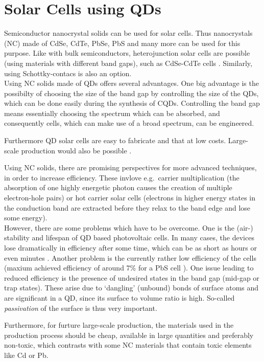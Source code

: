 \section{Solar Cells using QDs}

Semiconductor nanocrystal solids can be used for solar cells. Thus nanocrystals (NC) made of CdSe, CdTe, PbSe, PbS and many more can be used for this purpose. Like with bulk semiconductors, heterojunction solar cells are possible (using materials with different band gaps), such as CdSe-CdTe cells \cite[p.430]{ChemRev}. Similarly, using Schottky-contacs is also an option.\\

Using NC solids made of QDs offers several advantages. One big advantage is the possibilty of choosing the size of the band gap by controlling the size of the QDs, which can be done easily during the synthesis of CQDs. Controlling the band gap means essentially choosing the spectrum which can be absorbed, and consequently cells, which can make use of a broad spectrum, can be engineered.

Furthermore QD solar cells are easy to fabricate and that at low costs. Large-scale production would also be possible \cite[p.447]{ChemRev}.

Using NC solids, there are promising perspectives for more advanced techniques, in order to increase efficiency. These invlove e.g.~carrier multiplication (the absorption of one highly energetic photon causes the creation of multiple electron-hole pairs) or hot carrier solar cells (electrons in higher energy states in the conduction band are extracted before they relax to the band edge and lose some energy).\\

However, there are some problems which have to be overcome. One is the (air-) stability and lifespan of QD based photovoltaic cells. In many cases, the devices lose dramatically in efficiency after some time, which can be as short as hours or even minutes \cite[p.26]{Tang2011}. Another problem is the currently rather low efficiency of the cells (maxium achieved efficiency of around 7\% for a PbS cell \cite[p.1]{Ip2012}). One issue leading to reduced efficiency is the presence of undesired states in the band gap (mid-gap or trap states). These arise due to `dangling' (unbound) bonds of surface atoms and are significant in a QD, since its surface to volume ratio is high. So-called \textit{passivation} of the surface is thus very important. 

Furthermore, for furture large-scale production, the materials used in the production process should be cheap,  available in large quantities and preferably non-toxic, which contrasts with some NC materials that contain toxic elements like Cd or Pb.

